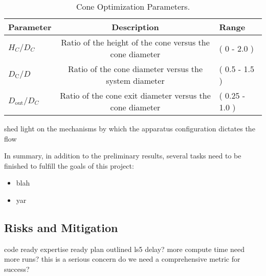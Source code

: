 %
%
\large
\begin{center}
\begin{table}[h]
 \centering
  \begin{tabular}{| l | c | l |}
    \hline
    Parameter & Description & Range \\
    \hline
    $H_C/D_C$ & Ratio of the height of the cone versus the cone diameter & ( 0 - 2.0 ) \\
    $D_{\text{C}}/D$ & Ratio of the cone diameter versus the system
       diameter & ( 0.5 - 1.5 ) \\
    $D_{\text{out}}/D_C$ & Ratio of the cone exit diameter versus the
       cone diameter & ( 0.25 - 1.0 ) \\ 
    \hline
  \end{tabular}
  \caption{Cone Optimization Parameters.}
  \label{tab:cone}
\end{table}
\end{center}
\normalsize

shed light on 
the mechanisms by which the apparatus configuration dictates the flow 


%
%

%
%


%
%




In summary, in addition to the preliminary results, several tasks need
to be finished to fulfill the goals of this project:

\begin{itemize}
\item blah
\item yar
\end{itemize}

%
%
\subsection{Risks and Mitigation}

code ready
expertise ready
plan outlined
ls5 delay?
more compute time
need more runs? this is a serious concern
do we need a comprehensive metric for success?
